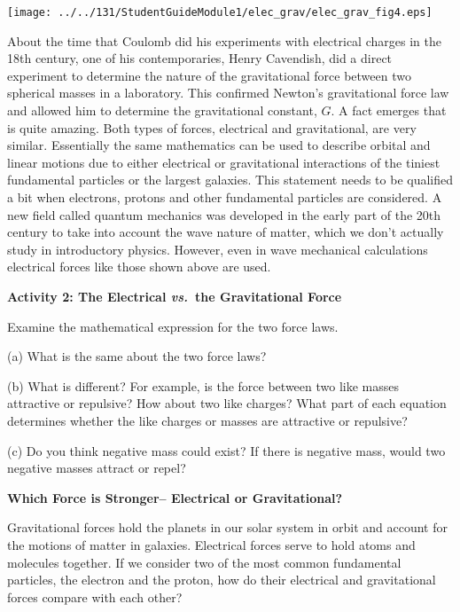 \vspace{0.3cm}
{\par\centering \texttt{[image: ../../131/StudentGuideModule1/elec\_grav/elec\_grav\_fig4.eps]} \par}
\vspace{0.3cm}

About the time that Coulomb did his experiments with electrical charges in the
18th century, one of his contemporaries, Henry Cavendish, did a direct experiment
to determine the nature of the gravitational force between two spherical masses
in a laboratory. This confirmed Newton's gravitational force law and allowed
him to determine the gravitational constant, $G$. A fact emerges that is quite
amazing. Both types of forces, electrical and gravitational, are very similar.
Essentially the same mathematics can be used to describe orbital and linear
motions due to either electrical or gravitational interactions of the tiniest
fundamental particles or the largest galaxies. This statement needs to be qualified
a bit when electrons, protons and other fundamental particles are considered.
A new field called quantum mechanics was developed in the early part of the 20th
century to take into account the wave nature of matter, which we don't actually
study in introductory physics. However, even in wave mechanical calculations
electrical forces like those shown above are used. 

\textbf{Activity 2: The Electrical \textit{vs.}~the Gravitational Force} 

Examine the mathematical expression for the two force laws.

(a) What is the same about the two force laws?
\answerspace{20mm}

(b) What is different? For example, is the force between two like masses attractive
or repulsive? How about two like charges? What part of each equation determines
whether the like charges or masses are attractive or repulsive?
\answerspace{20mm}

(c) Do you think negative mass could exist? If there is negative mass, would
two negative masses attract or repel?
\answerspace{20mm}

\textbf{Which Force is Stronger-- Electrical or Gravitational?} 

Gravitational forces hold the planets in our solar system in orbit and account
for the motions of matter in galaxies. Electrical forces serve to hold atoms
and molecules together. If we consider two of the most common fundamental particles,
the electron and the proton, how do their electrical and gravitational forces
compare with each other?

